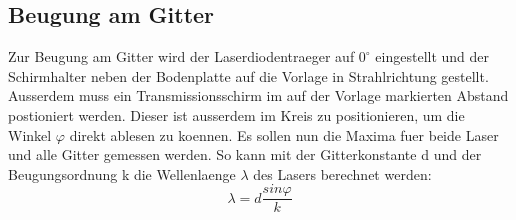 \subsection{Beugung am Gitter}
Zur Beugung am Gitter wird der Laserdiodentraeger auf $0^{\circ}$ eingestellt und der Schirmhalter neben der Bodenplatte auf die Vorlage in Strahlrichtung gestellt. Ausserdem muss ein Transmissionsschirm im auf der Vorlage markierten Abstand postioniert werden. Dieser ist ausserdem im Kreis zu positionieren, um die Winkel $\varphi$ direkt ablesen zu koennen. Es sollen nun die Maxima fuer beide Laser und alle Gitter gemessen werden. So kann mit der Gitterkonstante d und der Beugungsordnung k die Wellenlaenge $\lambda$ des Lasers berechnet werden:
\begin{equation}
    \lambda=d\frac{sin\varphi}{k}
\end{equation}
